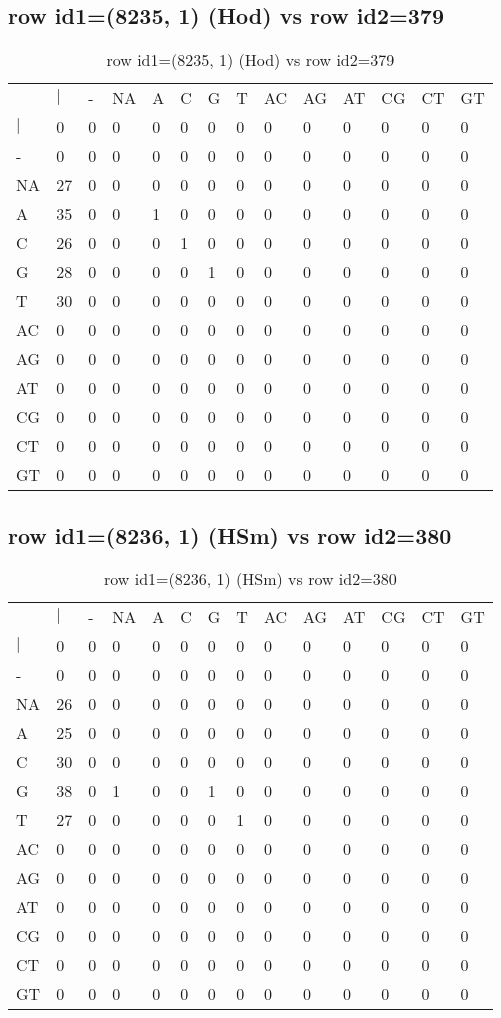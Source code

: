 \subsection{row id1=(8235, 1) (Hod) vs row id2=379}
\begin{center}
\begin{longtable}{|l|l|l|l|l|l|l|l|l|l|l|l|l|l|}
\caption{row id1=(8235, 1) (Hod) vs row id2=379} \label{table_dm360}\\
\hline
\\
\hline
&$|$&-&NA&A&C&G&T&AC&AG&AT&CG&CT&GT\\
$|$&0&0&0&0&0&0&0&0&0&0&0&0&0\\
-&0&0&0&0&0&0&0&0&0&0&0&0&0\\
NA&27&0&0&0&0&0&0&0&0&0&0&0&0\\
A&35&0&0&1&0&0&0&0&0&0&0&0&0\\
C&26&0&0&0&1&0&0&0&0&0&0&0&0\\
G&28&0&0&0&0&1&0&0&0&0&0&0&0\\
T&30&0&0&0&0&0&0&0&0&0&0&0&0\\
AC&0&0&0&0&0&0&0&0&0&0&0&0&0\\
AG&0&0&0&0&0&0&0&0&0&0&0&0&0\\
AT&0&0&0&0&0&0&0&0&0&0&0&0&0\\
CG&0&0&0&0&0&0&0&0&0&0&0&0&0\\
CT&0&0&0&0&0&0&0&0&0&0&0&0&0\\
GT&0&0&0&0&0&0&0&0&0&0&0&0&0\\
\hline
\end{longtable}
\end{center}

\subsection{row id1=(8236, 1) (HSm) vs row id2=380}
\begin{center}
\begin{longtable}{|l|l|l|l|l|l|l|l|l|l|l|l|l|l|}
\caption{row id1=(8236, 1) (HSm) vs row id2=380} \label{table_dm362}\\
\hline
\\
\hline
&$|$&-&NA&A&C&G&T&AC&AG&AT&CG&CT&GT\\
$|$&0&0&0&0&0&0&0&0&0&0&0&0&0\\
-&0&0&0&0&0&0&0&0&0&0&0&0&0\\
NA&26&0&0&0&0&0&0&0&0&0&0&0&0\\
A&25&0&0&0&0&0&0&0&0&0&0&0&0\\
C&30&0&0&0&0&0&0&0&0&0&0&0&0\\
G&38&0&1&0&0&1&0&0&0&0&0&0&0\\
T&27&0&0&0&0&0&1&0&0&0&0&0&0\\
AC&0&0&0&0&0&0&0&0&0&0&0&0&0\\
AG&0&0&0&0&0&0&0&0&0&0&0&0&0\\
AT&0&0&0&0&0&0&0&0&0&0&0&0&0\\
CG&0&0&0&0&0&0&0&0&0&0&0&0&0\\
CT&0&0&0&0&0&0&0&0&0&0&0&0&0\\
GT&0&0&0&0&0&0&0&0&0&0&0&0&0\\
\hline
\end{longtable}
\end{center}

